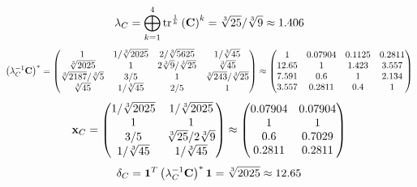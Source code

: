 \documentclass[10pt,a4paper]{article}
\begin{document}
	\[
		\lambda_{C} =  \bigoplus ^{4} _{k = 1} \operatorname{tr} ^{\frac 1 k} \left( \bold{C} \right)^k = {\sqrt[3]{25}} / {\sqrt[3]{9}}\approx 1.406
	\]
	\[
		\left(\lambda_{C}^{-1}\bold{C}\right)^* = 
		\begin{pmatrix}
			{1}{} & {1} / {\sqrt[3]{2025}} & {{2}} / {\sqrt[3]{5625}} & {1} / {\sqrt[3]{45}} \\
			{\sqrt[3]{2025}}{} & {1}{} & {{2}\sqrt[3]{9}} / {\sqrt[3]{25}} & {\sqrt[3]{45}}{} \\
			{\sqrt[3]{2187}} / {\sqrt[3]{5}} & {{3}} / {{5}} & {1}{} & {\sqrt[3]{243}} / {\sqrt[3]{25}} \\
			{\sqrt[3]{45}}{} & {1} / {\sqrt[3]{45}} & {{2}} / {{5}} & {1}{} \\
		\end{pmatrix}
		\approx
		\begin{pmatrix}
			1        & 0.07904  & 0.1125   & 0.2811   \\
			12.65    & 1        & 1.423    & 3.557    \\
			7.591    & 0.6      & 1        & 2.134    \\
			3.557    & 0.2811   & 0.4      & 1        \\
		\end{pmatrix}
	\]
	\[
		\bold{x}_{C} = 
		\begin{pmatrix}
			{1} / {\sqrt[3]{2025}} & {1} / {\sqrt[3]{2025}} \\
			{1}{} & {1}{} \\
			{{3}} / {{5}} & {\sqrt[3]{25}} / {{2}\sqrt[3]{9}} \\
			{1} / {\sqrt[3]{45}} & {1} / {\sqrt[3]{45}} \\
		\end{pmatrix}
		\approx
		\begin{pmatrix}
			0.07904  & 0.07904  \\
			1        & 1        \\
			0.6      & 0.7029   \\
			0.2811   & 0.2811   \\
		\end{pmatrix}
	\]
	\[
		\delta_{C} = \bold{1}^T \left(\lambda_{C}^{-1}\bold{C}\right)^* \bold{1} = {\sqrt[3]{2025}}{}\approx 12.65
	\]
\end{document}
